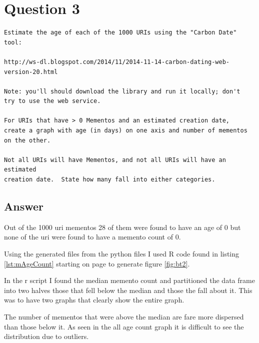 \documentclass[letterpaper,10pt]{article}
\begin{document}
\newpage  

\section*{Question 3}
\begin{verbatim}
Estimate the age of each of the 1000 URIs using the "Carbon Date" tool:

http://ws-dl.blogspot.com/2014/11/2014-11-14-carbon-dating-web-version-20.html

Note: you'll should download the library and run it locally; don't
try to use the web service.

For URIs that have > 0 Mementos and an estimated creation date,
create a graph with age (in days) on one axis and number of mementos
on the other.  

Not all URIs will have Mementos, and not all URIs will have an estimated
creation date.  State how many fall into either categories. 
\end{verbatim}
\subsection*{Answer}

Out of the 1000 uri mementos 28 of them were found to have an age of 0 but none of the uri were found to have a memento count of 0.   

Using the generated files from the python files I used R code found in listing \ref{lst:mAgeCount} starting on page \pageref{lst:mAgeCount} to generate figure \ref{fig:bt2}.

In the r script I found the median memento count and partitioned the data frame into two halves those that fell below the median and those the fall about it. This was to have two graphs that clearly show the entire graph.

The number of mementos that were above the median are fare more dispersed than those below it. As seen in the all age count graph it is difficult to see the distribution due to outliers. 
\end{document}
